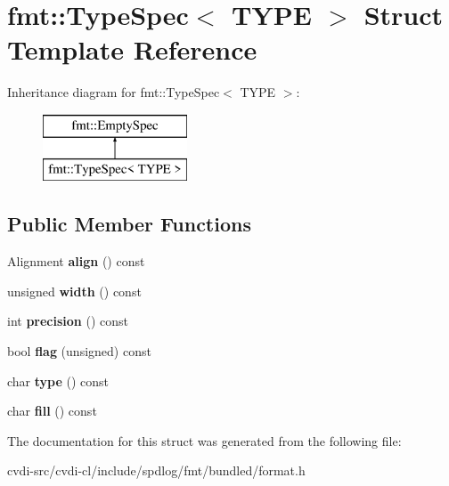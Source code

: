 \hypertarget{structfmt_1_1TypeSpec}{}\section{fmt\+:\+:Type\+Spec$<$ T\+Y\+PE $>$ Struct Template Reference}
\label{structfmt_1_1TypeSpec}
Inheritance diagram for fmt\+:\+:Type\+Spec$<$ T\+Y\+PE $>$\+:\begin{figure}[H]
\begin{center}
\leavevmode
\includegraphics[height=2.000000cm]{structfmt_1_1TypeSpec}
\end{center}
\end{figure}
\subsection*{Public Member Functions}
\begin{DoxyCompactItemize}
\item 
Alignment {\bfseries align} () const \hypertarget{structfmt_1_1TypeSpec_a0914257da0a346d13c256f345a6563ad}{}\label{structfmt_1_1TypeSpec_a0914257da0a346d13c256f345a6563ad}

\item 
unsigned {\bfseries width} () const \hypertarget{structfmt_1_1TypeSpec_a469e31c7122bcd1694efb2ccbb815e34}{}\label{structfmt_1_1TypeSpec_a469e31c7122bcd1694efb2ccbb815e34}

\item 
int {\bfseries precision} () const \hypertarget{structfmt_1_1TypeSpec_afa2ebf8c366ef48eea339653afc67c2c}{}\label{structfmt_1_1TypeSpec_afa2ebf8c366ef48eea339653afc67c2c}

\item 
bool {\bfseries flag} (unsigned) const \hypertarget{structfmt_1_1TypeSpec_af1cda506b61e726ffef16da053674df3}{}\label{structfmt_1_1TypeSpec_af1cda506b61e726ffef16da053674df3}

\item 
char {\bfseries type} () const \hypertarget{structfmt_1_1TypeSpec_aa76b699cfca958d608bf1769f166ffee}{}\label{structfmt_1_1TypeSpec_aa76b699cfca958d608bf1769f166ffee}

\item 
char {\bfseries fill} () const \hypertarget{structfmt_1_1TypeSpec_a51370a8d335e7896800ac510525c648a}{}\label{structfmt_1_1TypeSpec_a51370a8d335e7896800ac510525c648a}

\end{DoxyCompactItemize}


The documentation for this struct was generated from the following file\+:\begin{DoxyCompactItemize}
\item 
cvdi-\/src/cvdi-\/cl/include/spdlog/fmt/bundled/format.\+h\end{DoxyCompactItemize}
